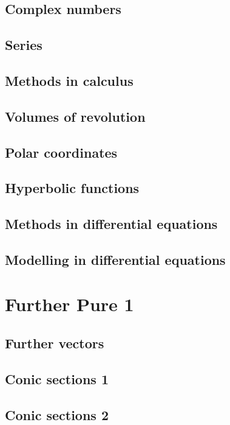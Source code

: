 \documentclass[oneside,fleqn,11pt]{book}
\begin{document}
\chapter{Complex numbers}

\chapter{Series}

\chapter{Methods in calculus}

\chapter{Volumes of revolution}

\chapter{Polar coordinates}

\chapter{Hyperbolic functions}

\chapter{Methods in differential equations}

\chapter{Modelling in differential equations}


\setcounter{chapter}{0}
\part{Further Pure 1}
\chapter{Further vectors}

\chapter{Conic sections 1}

\chapter{Conic sections 2}

\end{document}
